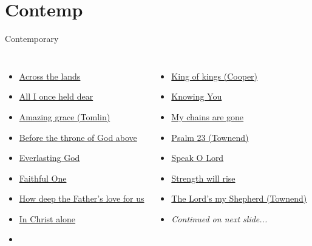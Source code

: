 \documentclass[aspectratio=169]{beamer}
\begin{document}
\section{ Contemp }

\begin{frame}[t]{Contemporary}
\begin{columns}[t]
\begin{itemize}
    \item \hyperlink{Across the lands["You're the Word of God the Father"](Townend)}{Across the lands}

    \item \hyperlink{Knowing You['All I once held dear']}{All I once held dear}

    \item \hyperlink{Amazing grace['My chains are gone'](Tomlin)}{Amazing grace (Tomlin)}

    \item \hyperlink{Before the throne of God above[]}{Before the throne of God above}

    \item \hyperlink{Everlasting God['Strength will rise']}{Everlasting God}

    \item \hyperlink{Faithful One[]}{Faithful One}

    \item \hyperlink{How deep the Father's love for us[](Townend)}{How deep the Father's love for us}

    \item \hyperlink{In Christ alone[]}{In Christ alone}

    \item[] \phantom{1}
\end{itemize}
\begin{itemize}
    \item \hyperlink{King of kings[](Cooper)}{King of kings (Cooper)}

    \item \hyperlink{Knowing You['All I once held dear']}{Knowing You}

    \item \hyperlink{Amazing grace['My chains are gone'](Tomlin)}{My chains are gone}

    \item \hyperlink{The Lord's my Shepherd['Psalm 23'](Townend)}{Psalm 23 (Townend)}

    \item \hyperlink{Speak O Lord[](Getty/Townend)}{Speak O Lord}

    \item \hyperlink{Everlasting God['Strength will rise']}{Strength will rise}

    \item \hyperlink{The Lord's my Shepherd['Psalm 23'](Townend)}{The Lord's my Shepherd (Townend)}

    \item[] \textit{Continued on next slide...}
\end{itemize}
\end{columns}
\end{frame}
\end{document}
